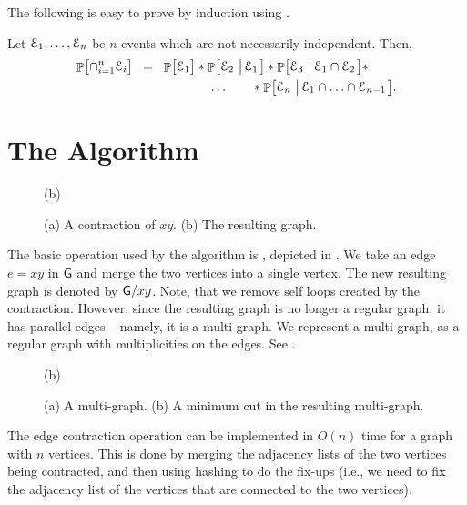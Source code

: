 
The following is easy to prove by induction using
.
\begin{lemma}
    Let $\EuScript{E}_{1},\ldots,\EuScript{E}_{n}$ be $n$ events which are not
    necessarily independent. Then,
    \begin{align*}
      \Prob{\bigl. \cap_{i=1}^{n}\Event_{i}} %
      &\EQ%
      \Prob{\bigl. \Event_{1}} * \Prob{\Event_{2}\sep{ \Event_{1}}}
      * \Prob{\Event_{3}\sep{\Event_{1}\cap\Event_{2}}} *
      \\&%
      \qquad\qquad\qquad\ldots\qquad *
      \Prob{\Event_{n} \sep{ \Event_{1}\cap\ldots\cap\Event_{n-1}}}.
    \end{align*}
\end{lemma}


\section{The Algorithm}

\begin{figure}[t]
   \centering
   {}{(b)}
   \caption{(a) A contraction of $xy$. (b) The resulting graph.}
\end{figure}


The basic operation used by the algorithm is , depicted in .  We take
an edge $e=x y$ in $\mathsf{G}$ and merge the two vertices into a single
vertex.  The new resulting graph is denoted by $\mathsf{G}/ x y$.  Note,
that we remove self loops created by the contraction.  However, since
the resulting graph is no longer a regular graph, it has parallel
edges -- namely, it is a multi-graph.  We represent a multi-graph, as
a regular graph with multiplicities on the edges. See
.


\begin{figure}[t]
   \centering
                  {}{(b)}%
   \caption{(a) A multi-graph. (b) A minimum cut in the resulting multi-graph.}%
\end{figure}

The edge contraction operation can be implemented in $O(n)$ time for a
graph with $n$ vertices. This is done by merging the adjacency lists
of the two vertices being contracted, and then using hashing to do the
fix-ups (i.e., we need to fix the adjacency list of the vertices that
are connected to the two vertices).

